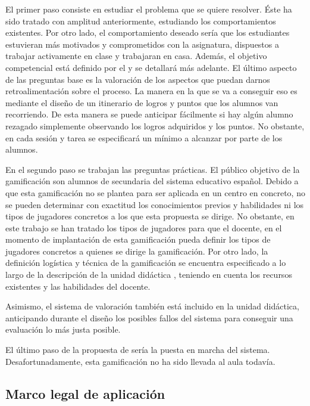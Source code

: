 El primer paso consiste en estudiar el problema que se quiere resolver. 
%
Éste ha sido tratado con amplitud anteriormente, estudiando los comportamientos existentes. 
%
Por otro lado, el comportamiento deseado sería que los estudiantes estuvieran más motivados y comprometidos con la asignatura, dispuestos a trabajar activamente en clase y trabajaran en casa.
%
Además, el objetivo competencial está definido por el \bocm y se detallará más adelante.
%
El último aspecto de las preguntas base es la valoración de los aspectos que puedan darnos retroalimentación sobre el proceso.
%
La manera en la que se va a conseguir eso es mediante el diseño de un itinerario de logros y puntos que los alumnos van recorriendo.
%
De esta manera se puede anticipar fácilmente si hay algún alumno rezagado simplemente observando los logros adquiridos y los puntos.
%
No obstante, en cada sesión y tarea se especificará un mínimo a alcanzar por parte de los alumnos.

En el segundo paso se trabajan las preguntas prácticas.
%
El público objetivo de la gamificación son alumnos de secundaria del sistema educativo español. 
%
Debido a que esta gamificación no se plantea para ser aplicada en un centro en concreto, no se pueden determinar con exactitud los conocimientos previos y habilidades ni los tipos de jugadores concretos a los que esta propuesta se dirige.
%
No obstante, en este trabajo se han tratado los tipos de jugadores  para que el docente, en el momento de implantación de esta gamificación pueda definir los tipos de jugadores concretos a quienes se dirige la gamificación.
%
Por otro lado, la definición logística y técnica de la gamificación se encuentra especificado a lo largo de la descripción de la unidad didáctica , teniendo en cuenta los recursos existentes y las habilidades del docente.

Asimismo, el sistema de valoración también está incluido en la unidad didáctica, anticipando durante el diseño los posibles fallos del sistema para conseguir una evaluación lo más justa posible.

El último paso de la propuesta de \cite{kapp2013gamification} sería la puesta en marcha del sistema. 
%
Desafortunadamente, esta gamificación no ha sido llevada al aula todavía.

\subsection{Marco legal de aplicación}

